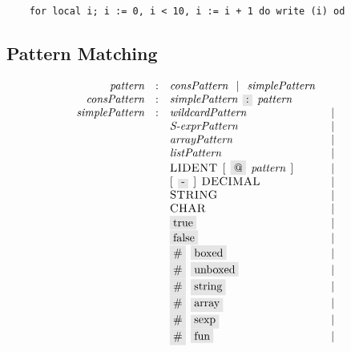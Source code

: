 \begin{lstlisting}
    for local i; i := 0, i < 10, i := i + 1 do write (i) od
\end{lstlisting}

\subsection{Pattern Matching}

\begin{figure}[t]
  \[
    \begin{array}{rcll}
      \defterm{pattern}         & : & \nonterm{consPattern}\alt\nonterm{simplePattern}&\\
      \defterm{consPattern}     & : & \nonterm{simplePattern}\s\term{:}\s\nonterm{pattern}&\\
      \defterm{simplePattern}   & : & \nonterm{wildcardPattern} & \alt\\
                                &   & \nonterm{S-exprPattern} & \alt \\
                                &   & \nonterm{arrayPattern} & \alt \\
                                &   & \nonterm{listPattern} & \alt \\
                                &   & \token{LIDENT}\s[\s\term{@}\s\nonterm{pattern} \s] & \alt \\
                                &   & [\s\term{-}\s]\s\token{DECIMAL}& \alt \\
                                &   & \token{STRING} & \alt \\
                                &   & \token{CHAR} & \alt \\
                                &   & \term{true} & \alt \\
                                &   & \term{false} & \alt \\
                                &   & \term{\#}\s\term{boxed} & \alt \\
                                &   & \term{\#}\s\term{unboxed} & \alt \\
                                &   & \term{\#}\s\term{string} & \alt \\
                                &   & \term{\#}\s\term{array} & \alt \\
                                &   & \term{\#}\s\term{sexp} & \alt \\
                                &   & \term{\#}\s\term{fun} & \alt \\

\end{array}\]
\end{figure}
